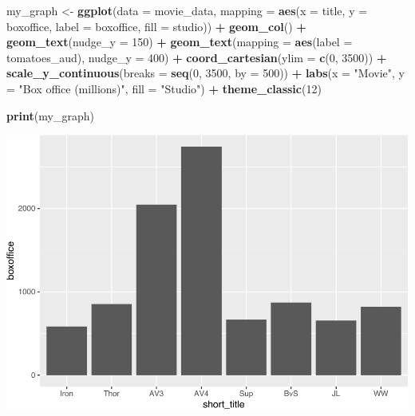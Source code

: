 \documentclass[
]{krantz}
\makeatletter
\newenvironment{Shaded}{\begin{snugshade}}{\end{snugshade}}
\newcommand{\DataTypeTok}[1]{\textcolor[rgb]{0.27,0.27,0.27}{#1}}
\newcommand{\DecValTok}[1]{\textcolor[rgb]{0.06,0.06,0.06}{#1}}
\newcommand{\KeywordTok}[1]{\textcolor[rgb]{0.27,0.27,0.27}{\textbf{#1}}}
\newcommand{\NormalTok}[1]{#1}
\newcommand{\OperatorTok}[1]{\textcolor[rgb]{0.43,0.43,0.43}{\textbf{#1}}}
\newcommand{\StringTok}[1]{\textcolor[rgb]{0.5,0.5,0.5}{#1}}
\newenvironment{kframe}{%
\medskip{}
\setlength{\fboxsep}{.8em}
 \def\at@end@of@kframe{}%
 \ifinner\ifhmode%
  \def\at@end@of@kframe{\end{minipage}}%
  \begin{minipage}{\columnwidth}%
 \fi\fi%
 \def\FrameCommand##1{\hskip\@totalleftmargin \hskip-\fboxsep
 \colorbox{shadecolor}{##1}\hskip-\fboxsep
     \hskip-\linewidth \hskip-\@totalleftmargin \hskip\columnwidth}%
 \MakeFramed {\advance\hsize-\width
   \@totalleftmargin\z@ \linewidth\hsize
   \@setminipage}}%
 {\par\unskip\endMakeFramed%
 \at@end@of@kframe}
\renewenvironment{Shaded}{\begin{kframe}}{\end{kframe}}
\makeatother
\begin{document}
\begin{Shaded}
\begin{Highlighting}[]
\NormalTok{my_graph <-}\StringTok{ }\KeywordTok{ggplot}\NormalTok{(}\DataTypeTok{data =}\NormalTok{ movie_data,}
           \DataTypeTok{mapping =} \KeywordTok{aes}\NormalTok{(}\DataTypeTok{x =}\NormalTok{ title,}
                         \DataTypeTok{y =}\NormalTok{ boxoffice,}
                         \DataTypeTok{label =}\NormalTok{ boxoffice, }
                         \DataTypeTok{fill =}\NormalTok{ studio)) }\OperatorTok{+}
\StringTok{  }\KeywordTok{geom_col}\NormalTok{() }\OperatorTok{+}
\StringTok{  }\KeywordTok{geom_text}\NormalTok{(}\DataTypeTok{nudge_y =} \DecValTok{150}\NormalTok{)  }\OperatorTok{+}
\StringTok{  }\KeywordTok{geom_text}\NormalTok{(}\DataTypeTok{mapping =} \KeywordTok{aes}\NormalTok{(}\DataTypeTok{label =}\NormalTok{ tomatoes_aud), }
            \DataTypeTok{nudge_y =} \DecValTok{400}\NormalTok{) }\OperatorTok{+}
\StringTok{  }\KeywordTok{coord_cartesian}\NormalTok{(}\DataTypeTok{ylim =} \KeywordTok{c}\NormalTok{(}\DecValTok{0}\NormalTok{, }\DecValTok{3500}\NormalTok{)) }\OperatorTok{+}
\StringTok{  }\KeywordTok{scale_y_continuous}\NormalTok{(}\DataTypeTok{breaks =} \KeywordTok{seq}\NormalTok{(}\DecValTok{0}\NormalTok{, }\DecValTok{3500}\NormalTok{, }\DataTypeTok{by =} \DecValTok{500}\NormalTok{)) }\OperatorTok{+}
\StringTok{  }\KeywordTok{labs}\NormalTok{(}\DataTypeTok{x =} \StringTok{"Movie"}\NormalTok{,}
       \DataTypeTok{y =} \StringTok{"Box office (millions)"}\NormalTok{,}
       \DataTypeTok{fill =} \StringTok{"Studio"}\NormalTok{) }\OperatorTok{+}
\StringTok{  }\KeywordTok{theme_classic}\NormalTok{(}\DecValTok{12}\NormalTok{)}
  

\KeywordTok{print}\NormalTok{(my_graph)}
\end{Highlighting}
\end{Shaded}

\includegraphics{bookdown_files/figure-latex/unnamed-chunk-253-1.pdf}
\end{document}
